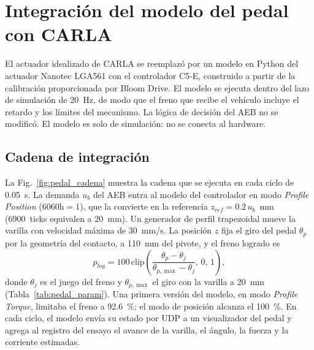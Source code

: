 \begingroup
\graphicspath{{figuras_pedal/}{./}}
\section{Integración del modelo del pedal con CARLA}
\label{sec:pedal_carla}

El actuador idealizado de CARLA se reemplazó por un modelo en Python del
actuador Nanotec LGA561 con el controlador C5-E, construido a partir de la
calibración proporcionada por Bloom Drive. El modelo se ejecuta dentro del
lazo de simulación de 20~Hz, de modo que el freno que recibe el vehículo
incluye el retardo y los límites del mecanismo. La lógica de decisión del
AEB no se modificó. El modelo es solo de simulación: no se conecta al
hardware.

\subsection{Cadena de integración}

La Fig.~\ref{fig:pedal_cadena} muestra la cadena que se ejecuta en cada
ciclo de 0.05~s. La demanda $u_b$ del AEB entra al modelo del controlador en
modo \textit{Profile Position} (6060h${}=1$), que la convierte en la
referencia $z_{ref}=0.2\,u_b$~mm (6900~ticks equivalen a 20~mm). Un
generador de perfil trapezoidal mueve la varilla con velocidad máxima de
30~mm/s. La posición $z$ fija el giro del pedal $\theta_p$ por la geometría
del contacto, a 110~mm del pivote, y el freno logrado es
\begin{equation}
  p_{log} = 100\,\mathrm{clip}\left(\frac{\theta_p-\theta_j}
            {\theta_{p,\max}-\theta_j},\,0,\,1\right),
  \label{eq:pedal_plog}
\end{equation}
donde $\theta_j$ es el juego del freno y $\theta_{p,\max}$ el giro con la
varilla a 20~mm (Tabla~\ref{tab:pedal_param}). Una primera versión del
modelo, en modo \textit{Profile Torque}, limitaba el freno a 92.6~\%; el
modo de posición alcanza el 100~\%. En cada ciclo, el modelo envía su estado
por UDP a un visualizador del pedal y agrega al registro del ensayo el avance
de la varilla, el ángulo, la fuerza y la corriente estimadas.

